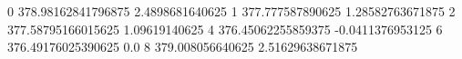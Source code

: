 0 378.98162841796875 2.4898681640625
1 377.777587890625 1.28582763671875
2 377.58795166015625 1.09619140625
4 376.45062255859375 -0.0411376953125
6 376.49176025390625 0.0
8 379.008056640625 2.51629638671875
